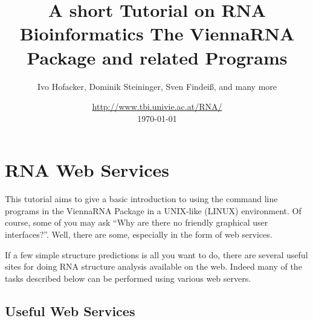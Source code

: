 \documentclass[a4paper]{article}
\title{A short Tutorial on RNA Bioinformatics\newline
{\small The ViennaRNA Package and related Programs}}
\author{Ivo Hofacker, Dominik Steininger, Sven Findei{\ss}, and many more\\
\vspace{2cm}}
\date{\url{http://www.tbi.univie.ac.at/RNA/}\\[1ex]\today}
\newcommand{\frametitle}[1]{\subsubsection{#1}}
\begin{document}


\maketitle
\newpage

\tableofcontents
\newpage


\section{RNA Web Services}
This tutorial aims to give a basic introduction to using the command line
programs in the ViennaRNA Package in a UNIX-like (LINUX) environment.
Of course, some of you may ask ``Why are there no friendly graphical user
interfaces?''. Well, there are some, especially in the form of web
services. 

If a few simple structure predictions is all you want to do, there are
several useful sites for doing RNA structure analysis available
on the web. Indeed many of the tasks described below can be performed using
various web servers.

\subsection{Useful Web Services}
\end{document}
